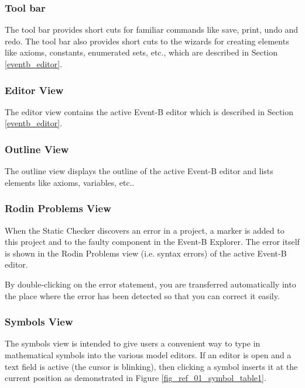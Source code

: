 \subsubsection{Tool bar}
\label{tool_bar}

The tool bar provides short cuts for familiar commands like save, print, undo and redo. The tool bar also provides short cuts to the wizards for creating elements like axioms, constants, enumerated sets, etc., which are described in Section \ref{eventb_editor}.

\subsubsection{Editor View}
\label{editor_view}

The editor view contains the active Event-B editor which is described in Section \ref{eventb_editor}.

\subsubsection{Outline View}
\label{outline_view}

The outline view displays the outline of the active Event-B editor and lists elements like axioms, variables, etc.. 

\subsubsection{Rodin Problems View}
\label{rodin_problems_view}

When the Static Checker discovers an error in a project, a  marker is added to this project and to the faulty component in the \textsf{Event-B Explorer}. The error itself is shown in the Rodin Problems view (i.e. syntax errors) of the active Event-B editor.

By double-clicking on the error statement, you are transferred automatically into the place where the error has been detected so that you can correct it easily.

\subsubsection{Symbols View}
\label{symbols_view}

The symbols view is intended to give users a convenient way to type in mathematical symbols into the various model editors. If an editor is open and a text field is active (the cursor is blinking), then clicking a symbol inserts it at the current position as demonstrated in Figure \ref{fig_ref_01_symbol_table1}. 

